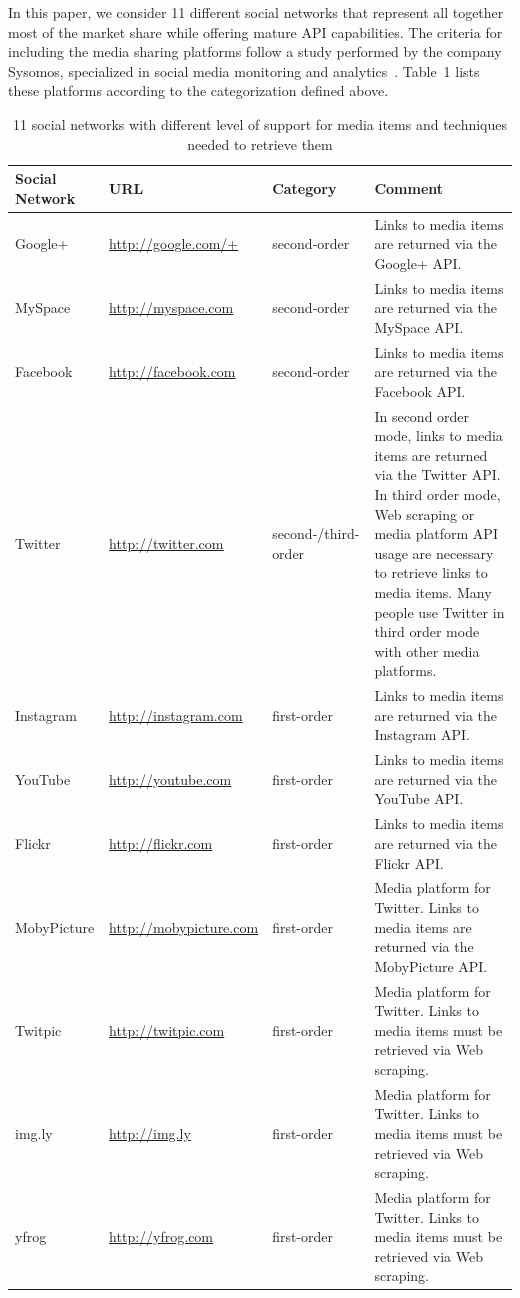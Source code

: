 \documentclass{acm_proc_article-sp}
\newcommand{\inlinelistingsize}{\fontsize{8pt}{11pt}}
\let\oldurl\url
\renewcommand{\url}[1]{\inlinelistingsize\oldurl{#1}}
\begin{document}
In this paper, we consider 11 different social networks that represent all together most of the market share while offering mature API capabilities.
The criteria for including the media sharing platforms follow a study performed by the company Sysomos, specialized in social media monitoring and analytics~\cite{Sysomos2011}. Table~1 lists these platforms according to the categorization defined above.
\begin{table}[htbp]
  {\small
  \begin{tabular}{|l|l|l|p{8cm}|}
    \hline
    \textbf{Social Network} & \textbf{URL} & \textbf{Category} & \textbf{Comment}\\
    \hline
	Google+ & \url{http://google.com/+} & second-order & Links to media items are returned via the Google+ API.\\
	MySpace & \url{http://myspace.com} & second-order & Links to media items are returned via the MySpace API.\\
	Facebook & \url{http://facebook.com} & second-order & Links to media items are returned via the Facebook API.\\
	Twitter & \url{http://twitter.com} & second-/third-order & In second order mode, links to media items are returned via the Twitter API. In third order mode, Web scraping or media platform API usage are necessary to retrieve links to media items. Many people use Twitter in third order mode with other media platforms.\\\hline
	Instagram & \url{http://instagram.com} & first-order & Links to media items are returned via the Instagram API.\\
	YouTube & \url{http://youtube.com} & first-order & Links to media items are returned via the YouTube API.\\
	Flickr & \url{http://flickr.com} & first-order & Links to media items are returned via the Flickr API.\\
	MobyPicture & \url{http://mobypicture.com} & first-order & Media platform for Twitter. Links to media items are returned via the MobyPicture API.\\
	Twitpic & \url{http://twitpic.com} & first-order & Media platform for Twitter. Links to media items must be retrieved via Web scraping.\\
	img.ly & \url{http://img.ly} & first-order & Media platform for Twitter. Links to media items must be retrieved via Web scraping.\\
	yfrog & \url{http://yfrog.com} & first-order & Media platform for Twitter. Links to media items must be retrieved via Web scraping.\\
	\hline
  \end{tabular}
  }
  \label{tab:platforms}
  \caption{11 social networks with different level of support for media items and techniques needed to retrieve them}
\end{table}
\end{document}
